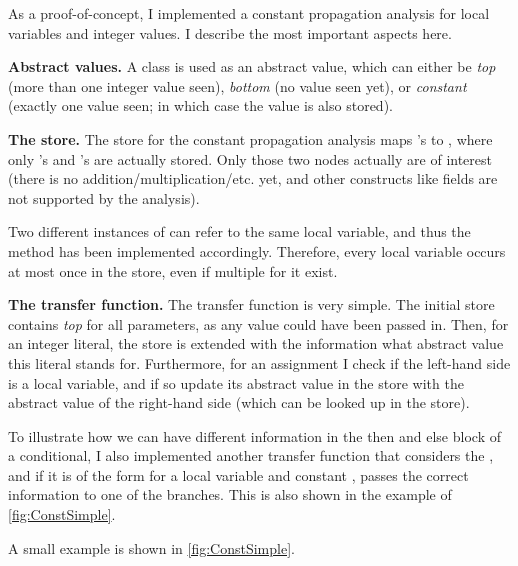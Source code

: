 \begin{workinprogress}
    As a proof-of-concept, I implemented a constant propagation analysis for local variables
    and integer values. I describe the most important aspects here.
    
    \textbf{Abstract values.} A class  is used as an abstract value, which can
    either be \emph{top} (more than one integer value seen), \emph{bottom} (no value seen yet),
    or \emph{constant} (exactly one value seen; in which case the value is also stored).
    
    \textbf{The store.} The store for the constant propagation analysis maps 's to ,
    where only 's and 's are actually stored. Only those
    two nodes actually are of interest (there is no addition/multiplication/etc. yet, and other constructs like
    fields are not supported by the analysis).
    
    Two different instances of  can refer to the same local variable, and thus
    the  method has been implemented accordingly. Therefore, every local variable occurs
    at most once in the store, even if multiple  for it exist.
    
    \textbf{The transfer function.} The transfer function is very simple. The initial store contains
    \emph{top} for all parameters, as any value could have been passed in. Then, for
    an integer literal, the store is extended with the information what abstract value this literal
    stands for. Furthermore, for an assignment I check if the left-hand side is
    a local variable, and if so update its abstract value in the
    store with the abstract value of the right-hand side (which can be looked up in the store).
    
    To illustrate how we can have different information in the then and else block of a conditional,
    I also implemented another transfer function that considers the , and if
    it is of the form  for a local variable  and constant , passes
    the correct information to one of the branches. This is also shown in the example of \autoref{fig:ConstSimple}.
    
     A small example is shown in \autoref{fig:ConstSimple}.
\end{workinprogress}



